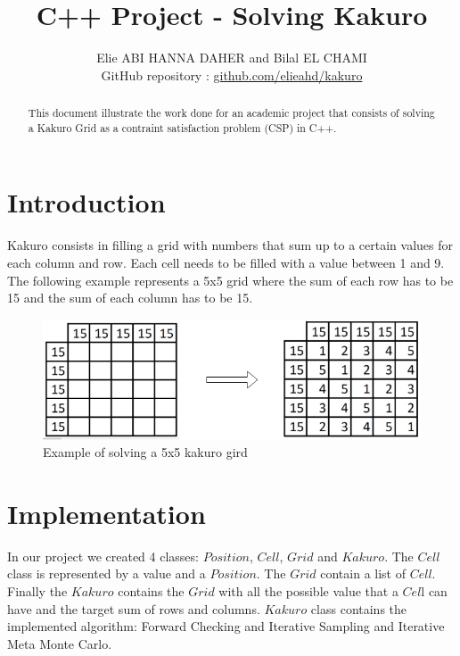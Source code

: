 \documentclass[journal, a4paper]{IEEEtran}
\begin{document}
\title{C++ Project - Solving Kakuro}
\author{
	Elie ABI HANNA DAHER and Bilal EL CHAMI \\ 
	GitHub repository : \href{https://github.com/elieahd/kakuro}{github.com/elieahd/kakuro}
}
\maketitle

\begin{abstract}
	This document illustrate the work done for an academic project that consists of solving a Kakuro Grid as a contraint satisfaction problem (CSP) in C++.
\end{abstract}

\section{Introduction}
 Kakuro consists in filling a grid with numbers that sum up to a certain values for each column and row. Each cell needs to be filled with a value between 1 and 9.\\
 The following example represents a 5x5 grid where the sum of each row has to be 15 and the sum of each column has to be 15.
\begin{figure}[h!]
    	 \begin{center}
		\includegraphics[width=\columnwidth]{example_kakuro.png}
  		\caption{Example of solving a 5x5 kakuro gird}
		\label{fig:example_kakuro}
    	 \end{center}
\end{figure}

\section{Implementation}
In our project we created 4 classes: $Position$, $Cell$, $Grid$ and $Kakuro$. The $Cell$ class is represented by a value and a $Position$. The $Grid$ contain a list of $Cell$. Finally the $Kakuro$ contains the $Grid$ with all the possible value that a $Cel$l can have and the target sum of rows and columns. $Kakuro$ class contains the implemented algorithm: Forward Checking and Iterative Sampling and Iterative Meta Monte Carlo. \\
\end{document}
